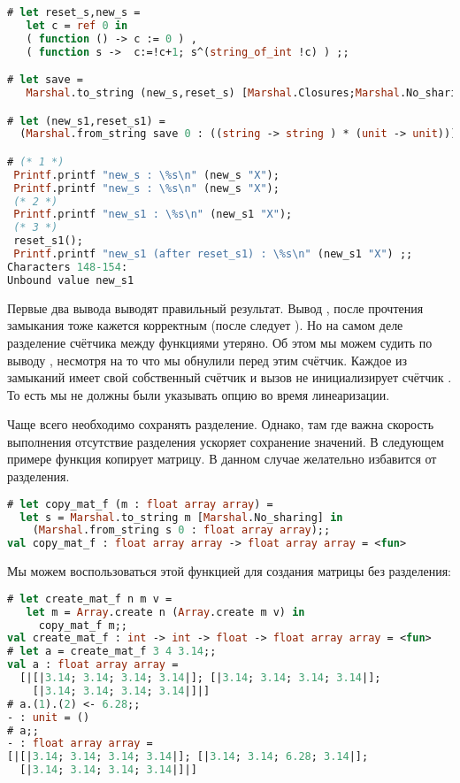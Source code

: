 \begin{lstlisting}[language=OCaml]
# let reset_s,new_s = 
   let c = ref 0 in 
   ( function () -> c := 0 ) ,
   ( function s ->  c:=!c+1; s^(string_of_int !c) ) ;;

# let save = 
   Marshal.to_string (new_s,reset_s) [Marshal.Closures;Marshal.No_sharing] ;;

# let (new_s1,reset_s1) = 
  (Marshal.from_string save 0 : ((string -> string ) * (unit -> unit))) ;;

# (* 1 *)
 Printf.printf "new_s : \%s\n" (new_s "X"); 
 Printf.printf "new_s : \%s\n" (new_s "X");
 (* 2 *)
 Printf.printf "new_s1 : \%s\n" (new_s1 "X"); 
 (* 3 *)
 reset_s1(); 
 Printf.printf "new_s1 (after reset_s1) : \%s\n" (new_s1 "X") ;;
Characters 148-154:
Unbound value new_s1
\end{lstlisting}

Первые два вывода  выводят правильный результат. Вывод , после прочтения замыкания тоже кажется корректным (после  следует 
). Но на самом деле разделение счётчика  между функциями 
  утеряно. Об этом мы можем судить по выводу 
, несмотря на то что мы обнулили перед этим счётчик. Каждое из 
замыканий имеет свой собственный счётчик и вызов  не 
инициализирует счётчик . То есть мы не должны были указывать опцию 
 во время линеаризации.

Чаще всего необходимо сохранять разделение. Однако, там где важна скорость 
выполнения отсутствие разделения ускоряет сохранение значений. В следующем 
примере функция копирует матрицу. В данном случае желательно избавится от 
разделения.

\begin{lstlisting}[language=OCaml]
# let copy_mat_f (m : float array array) = 
  let s = Marshal.to_string m [Marshal.No_sharing] in 
    (Marshal.from_string s 0 : float array array);;
val copy_mat_f : float array array -> float array array = <fun>
\end{lstlisting}

Мы можем воспользоваться этой функцией для создания матрицы без разделения:

\begin{lstlisting}[language=OCaml]
# let create_mat_f n m v = 
   let m = Array.create n (Array.create m v) in 
     copy_mat_f m;;
val create_mat_f : int -> int -> float -> float array array = <fun>
# let a = create_mat_f 3 4 3.14;;
val a : float array array =
  [|[|3.14; 3.14; 3.14; 3.14|]; [|3.14; 3.14; 3.14; 3.14|];
    [|3.14; 3.14; 3.14; 3.14|]|]
# a.(1).(2) <- 6.28;;
- : unit = ()
# a;;
- : float array array =
[|[|3.14; 3.14; 3.14; 3.14|]; [|3.14; 3.14; 6.28; 3.14|];
  [|3.14; 3.14; 3.14; 3.14|]|]
\end{lstlisting}

